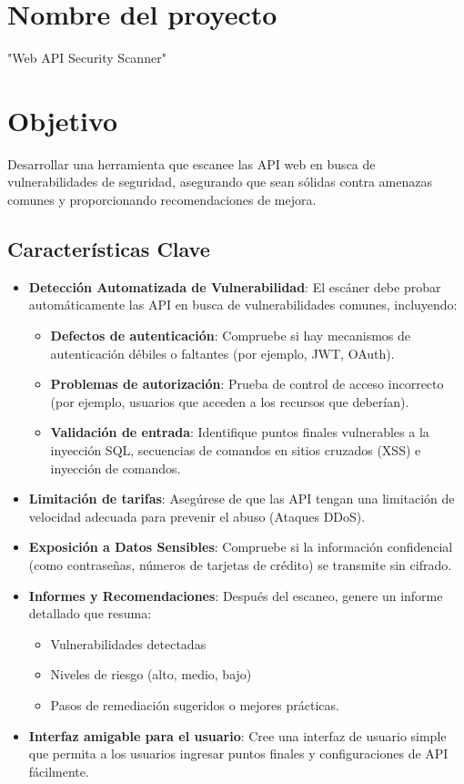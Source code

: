 \documentclass{article}
\begin{document}
	\newpage
	
    \section{Nombre del proyecto}

    \large
    "Web API Security Scanner"
    
    \section{Objetivo}

    Desarrollar una herramienta que escanee las API web en busca de vulnerabilidades de seguridad, asegurando que sean sólidas contra amenazas comunes y proporcionando recomendaciones de mejora.

    \subsection{Características Clave}

    \begin{itemize}
        \item \textbf{Detección Automatizada de Vulnerabilidad}: El escáner debe probar automáticamente las API en busca de vulnerabilidades comunes, incluyendo:
        \begin{itemize}
            \item \textbf{Defectos de autenticación}: Compruebe si hay mecanismos de autenticación débiles o faltantes (por ejemplo, JWT, OAuth).
            \item \textbf{Problemas de autorización}: Prueba de control de acceso incorrecto (por ejemplo, usuarios que acceden a los recursos que deberían).
            \item \textbf{Validación de entrada}: Identifique puntos finales vulnerables a la inyección SQL, secuencias de comandos en sitios cruzados (XSS) e inyección de comandos.
        \end{itemize}
        \item \textbf{Limitación de tarifas}: Asegúrese de que las API tengan una limitación de velocidad adecuada para prevenir el abuso (Ataques DDoS).
        \item \textbf{Exposición a Datos Sensibles}: Compruebe si la información confidencial (como contraseñas, números de tarjetas de crédito) se transmite sin cifrado.
        \item \textbf{Informes y Recomendaciones}: Después del escaneo, genere un informe detallado que resuma:
        \begin{itemize}
            \item Vulnerabilidades detectadas
            \item Niveles de riesgo (alto, medio, bajo)
            \item Pasos de remediación sugeridos o mejores prácticas.
        \end{itemize}
        \item \textbf{Interfaz amigable para el usuario}: Cree una interfaz de usuario simple que permita a los usuarios ingresar puntos finales y configuraciones de API fácilmente.
    \end{itemize}
\end{document}
